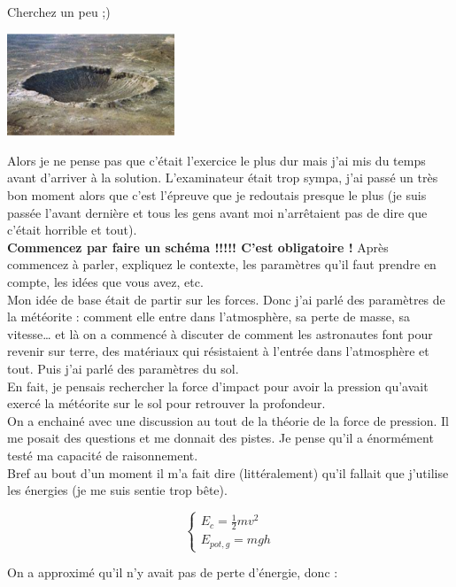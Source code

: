 Cherchez un peu ;)

\begin{center}
\includegraphics[width=5cm]{cratere.png}
\end{center}

Alors je ne pense pas que c’était l’exercice le plus dur mais j’ai mis du temps avant d’arriver à la solution. L’examinateur était trop sympa, j’ai passé un très bon moment alors que c’est l’épreuve que je redoutais presque le plus (je suis passée l’avant dernière et tous les gens avant moi n’arrêtaient pas de dire que c’était horrible et tout).\\

\textbf{Commencez par faire un schéma !!!!! C’est obligatoire !} Après commencez à parler, expliquez le contexte, les paramètres qu’il faut prendre en compte, les idées que vous avez, etc.\\
Mon idée de base était de partir sur les forces. Donc j’ai parlé des paramètres de la météorite : comment elle entre dans l’atmosphère, sa perte de masse, sa vitesse… et là on a commencé à discuter de comment les astronautes font pour revenir sur terre, des matériaux qui résistaient à l’entrée dans l’atmosphère et tout. Puis j’ai parlé des paramètres du sol.\\

En fait, je pensais rechercher la force d’impact pour avoir la pression qu’avait exercé la météorite sur le sol pour retrouver la profondeur.\\
On a enchainé avec une discussion au tout de la théorie de la force de pression. Il me posait des questions et me donnait des pistes. Je pense qu’il a énormément testé ma capacité de raisonnement.\\

Bref au bout d’un moment il m’a fait dire (littéralement) qu’il fallait que j’utilise les énergies (je me
suis sentie trop bête).


$$
\begin{cases}
E_c= \frac12mv^2\\
E_{pot,g} = mgh
\end{cases}
$$


On a approximé qu’il n’y avait pas de perte d’énergie, donc :

